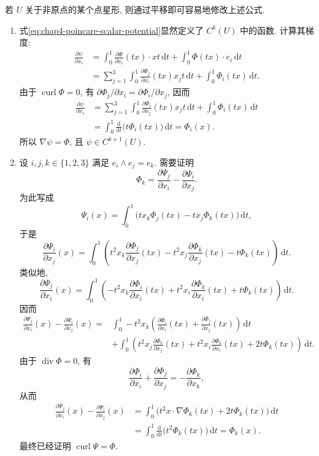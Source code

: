 若 $U$ 关于非原点的某个点星形, 则通过平移即可容易地修改上述公式.

\begin{Proof}
\begin{enumerate}
 \item 式\eqref{eq:chap4-poincare-scalar-potential}显然定义了 $C^k(U)$ 中的函数. 计算其梯度:
 \[
  \begin{aligned}
  \frac{\partial\psi}{\partial x_i}
  &=\int_0^1\frac{\partial\Phi}{\partial x_i}(tx)\cdot xt\,\mathrm dt
    +\int_0^1\Phi(tx)\cdot e_i\,\mathrm dt\\
  &=\sum_{j=1}^3\int_0^1\frac{\partial\Phi_j}{\partial x_i}(tx)x_jt\,\mathrm dt
    +\int_0^1\Phi_i(tx)\,\mathrm dt.
  \end{aligned}
 \]
 由于 $\operatorname{curl}\Phi=0$, 有 $\partial\Phi_j/\partial x_i=\partial\Phi_i/\partial x_j$, 因而
 \[
  \begin{aligned}
  \frac{\partial\psi}{\partial x_i}
  &=\sum_{j=1}^3\int_0^1\frac{\partial\Phi_i}{\partial x_j}(tx)x_jt\,\mathrm dt
    +\int_0^1\Phi_i(tx)\,\mathrm dt\\
  &=\int_0^1\frac{\mathrm d}{\mathrm dt}\bigl(t\Phi_i(tx)\bigr)\,\mathrm dt
   =\Phi_i(x).
  \end{aligned}
 \]
 所以 $\nabla\psi=\Phi$, 且 $\psi\in C^{k+1}(U)$.

 \item 设 $i,j,k\in\{1,2,3\}$ 满足 $e_i\wedge e_j=e_k$. 需要证明
 \[
  \Phi_k=\frac{\partial\Psi_j}{\partial x_i}
  -\frac{\partial\Psi_i}{\partial x_j}.
 \]
 为此写成
 \[
  \Psi_i(x)=\int_0^1\bigl(tx_k\Phi_j(tx)-tx_j\Phi_k(tx)\bigr)\,\mathrm dt,
 \]
 于是
 \[
  \frac{\partial\Psi_i}{\partial x_j}(x)
  =\int_0^1\left(
  t^2x_k\frac{\partial\Phi_j}{\partial x_j}(tx)
  -t^2x_j\frac{\partial\Phi_k}{\partial x_j}(tx)
  -t\Phi_k(tx)\right)\,\mathrm dt.
 \]
 类似地,
 \[
  \frac{\partial\Psi_j}{\partial x_i}(x)
  =\int_0^1\left(
  -t^2x_k\frac{\partial\Phi_i}{\partial x_i}(tx)
  +t^2x_i\frac{\partial\Phi_k}{\partial x_i}(tx)
  +t\Phi_k(tx)\right)\,\mathrm dt.
 \]
 因而
 \[
  \begin{aligned}
  \frac{\partial\Psi_j}{\partial x_i}(x)
  -\frac{\partial\Psi_i}{\partial x_j}(x)
  ={}&\int_0^1-t^2x_k\left(
  \frac{\partial\Phi_i}{\partial x_i}(tx)
  +\frac{\partial\Phi_j}{\partial x_j}(tx)\right)\,\mathrm dt\\
  &+\int_0^1\left(
  t^2x_j\frac{\partial\Phi_k}{\partial x_j}(tx)
  +t^2x_i\frac{\partial\Phi_k}{\partial x_i}(tx)
  +2t\Phi_k(tx)\right)\,\mathrm dt.
  \end{aligned}
 \]
 由于 $\operatorname{div}\Phi=0$, 有
 \[
  \frac{\partial\Phi_i}{\partial x_i}
  +\frac{\partial\Phi_j}{\partial x_j}
  =-\frac{\partial\Phi_k}{\partial x_k},
 \]
 从而
 \[
  \begin{aligned}
  \frac{\partial\Psi_j}{\partial x_i}(x)
  -\frac{\partial\Psi_i}{\partial x_j}(x)
  &=\int_0^1\bigl(t^2x\cdot\nabla\Phi_k(tx)+2t\Phi_k(tx)\bigr)\,\mathrm dt\\
  &=\int_0^1\frac{\mathrm d}{\mathrm dt}\bigl(t^2\Phi_k(tx)\bigr)\,\mathrm dt
  =\Phi_k(x).
  \end{aligned}
 \]
 最终已经证明 $\operatorname{curl}\Psi=\Phi$.
\end{enumerate}
\end{Proof}
